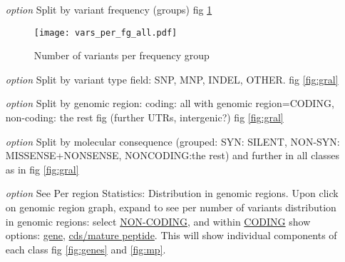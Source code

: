 \documentclass[a4paper, 10pt]{article}        %
\begin{document}
\begin{enumerate}
\begin{itemize}
\item[\textsl{option}] Split by variant frequency (groups) fig \ref{fig:freq}
   
     \begin{figure}[!h]
     \centering
     \texttt{[image: vars\_per\_fg\_all.pdf]}
  \caption{Number of variants per frequency group}
\label{fig:freq}
     \end{figure}
     
     
\item[\textsl{option}] Split by variant type field: SNP, MNP, INDEL, OTHER. fig \ref{fig:gral}
\item[\textsl{option}] Split by genomic region: coding: all with genomic region=CODING, non-coding: the rest fig (further UTRs, intergenic?) fig \ref{fig:gral}
\item[\textsl{option}] Split by molecular consequence (grouped: SYN: SILENT, NON-SYN: MISSENSE+NONSENSE, NONCODING:the rest) and further in all classes as in fig \ref{fig:gral} 

     
\item[\textsl{option}] See Per region Statistics: Distribution in genomic regions. Upon click on genomic region graph, expand to see per number of variants distribution in genomic regions: select \underline{NON-CODING}, and within \underline{CODING} show options: \underline{gene}, \underline{cds/mature peptide}. This will show individual components of each class fig  \ref{fig:genes} and \ref{fig:mp}.


\end{itemize}
\end{enumerate}
\end{document}
